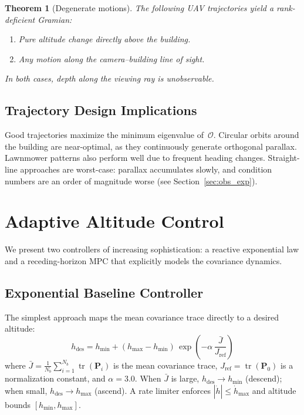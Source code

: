 \documentclass[journal]{IEEEtran}
\newtheorem{theorem}{Theorem}
\newcommand{\vP}{\mathbf{P}}
\newcommand{\tr}{\operatorname{tr}}
\begin{document}
\begin{theorem}[Degenerate motions]
The following UAV trajectories yield a rank-deficient Gramian:
\begin{enumerate}
    \item Pure altitude change directly above the building.
    \item Any motion along the camera--building line of sight.
\end{enumerate}
In both cases, depth along the viewing ray is unobservable.
\end{theorem}

\subsection{Trajectory Design Implications}
Good trajectories maximize the minimum eigenvalue of~$\mathcal{O}$.
Circular orbits around the building are near-optimal, as they continuously generate orthogonal parallax.
Lawnmower patterns also perform well due to frequent heading changes.
Straight-line approaches are worst-case: parallax accumulates slowly, and condition numbers are an order of magnitude worse (see Section~\ref{sec:obs_exp}).

\section{Adaptive Altitude Control}

We present two controllers of increasing sophistication: a reactive exponential law and a receding-horizon MPC that explicitly models the covariance dynamics.

\subsection{Exponential Baseline Controller}
The simplest approach maps the mean covariance trace directly to a desired altitude:
\begin{equation}\label{eq:control}
    h_{\text{des}} = h_{\min} + (h_{\max} - h_{\min})\,\exp\!\left(-\alpha\,\frac{\bar{J}}{J_{\text{ref}}}\right)
\end{equation}
where $\bar{J} = \frac{1}{N_b}\sum_{i=1}^{N_b}\tr(\vP_i)$ is the mean covariance trace, $J_{\text{ref}} = \tr(\vP_0)$ is a normalization constant, and $\alpha = 3.0$.
When $\bar{J}$ is large, $h_{\text{des}} \to h_{\min}$ (descend); when small, $h_{\text{des}} \to h_{\max}$ (ascend).
A rate limiter enforces $|\dot{h}| \leq \dot{h}_{\max}$ and altitude bounds $[h_{\min}, h_{\max}]$.
\end{document}
